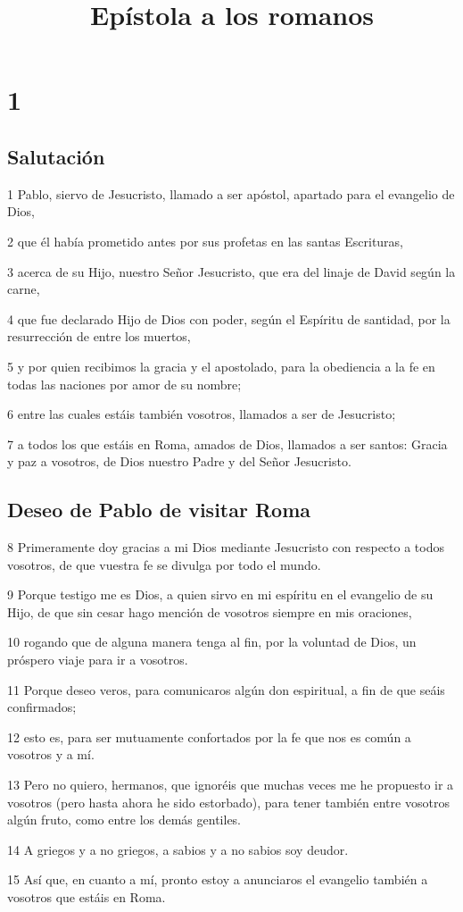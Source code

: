 
\title{Epístola a los romanos}

\chapter{1}

\section*{Salutación}

\par 1 Pablo, siervo de Jesucristo, llamado a ser apóstol, apartado para el evangelio de Dios,
\par 2 que él había prometido antes por sus profetas en las santas Escrituras,
\par 3 acerca de su Hijo, nuestro Señor Jesucristo, que era del linaje de David según la carne,
\par 4 que fue declarado Hijo de Dios con poder, según el Espíritu de santidad, por la resurrección de entre los muertos,
\par 5 y por quien recibimos la gracia y el apostolado, para la obediencia a la fe en todas las naciones por amor de su nombre;
\par 6 entre las cuales estáis también vosotros, llamados a ser de Jesucristo;
\par 7 a todos los que estáis en Roma, amados de Dios, llamados a ser santos: Gracia y paz a vosotros, de Dios nuestro Padre y del Señor Jesucristo.

\section*{Deseo de Pablo de visitar Roma}

\par 8 Primeramente doy gracias a mi Dios mediante Jesucristo con respecto a todos vosotros, de que vuestra fe se divulga por todo el mundo.
\par 9 Porque testigo me es Dios, a quien sirvo en mi espíritu en el evangelio de su Hijo, de que sin cesar hago mención de vosotros siempre en mis oraciones,
\par 10 rogando que de alguna manera tenga al fin, por la voluntad de Dios, un próspero viaje para ir a vosotros.
\par 11 Porque deseo veros, para comunicaros algún don espiritual, a fin de que seáis confirmados;
\par 12 esto es, para ser mutuamente confortados por la fe que nos es común a vosotros y a mí.
\par 13 Pero no quiero, hermanos, que ignoréis que muchas veces me he propuesto ir a vosotros (pero hasta ahora he sido estorbado), para tener también entre vosotros algún fruto, como entre los demás gentiles.
\par 14 A griegos y a no griegos, a sabios y a no sabios soy deudor.
\par 15 Así que, en cuanto a mí, pronto estoy a anunciaros el evangelio también a vosotros que estáis en Roma.


